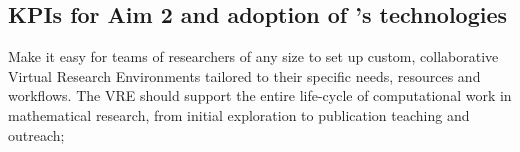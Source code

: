 \subsection{KPIs for Aim 2 and adoption of \ODK's technologies}

\begin{aim}
  Make it easy for teams of researchers of any size to set up custom,
  collaborative Virtual Research Environments tailored to their
  specific needs, resources and workflows. The VRE should support the
  entire life-cycle of computational work in mathematical research,
  from initial exploration to publication teaching and outreach;
\end{aim}


